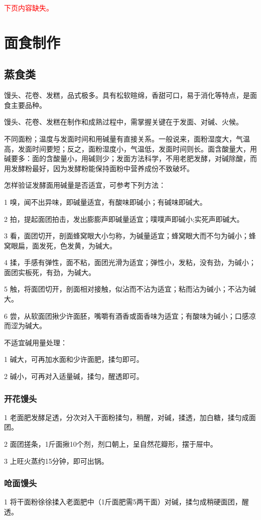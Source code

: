 \documentclass{ctexbook}
\begin{document}
\textcolor{red}{下页内容缺失。}
\chapter{面食制作}
\section{蒸食类}
馒头、花卷、发糕，品式极多。具有松软暄绵，香甜可口，易于消化等特点，是面食主要品种。

馒头、花卷、发糕在制作和成熟过程中，需掌握关键在于发面、对碱、火候。

不同面粉；温度与发面时间和用碱量有直接关系。一般说来，面粉湿度大，气温高，发面时间要短；反之，面粉湿度小，气温低，发面时间则长。面含酸量大，用碱要多：面的含酸量小，用碱则少；发面方法科学，不用老肥发酵，对碱除酸，而用发酵粉最好，因为发酵粉能保持面粉中营养成份不致破坏。

怎样验证发酵面用碱量是否适宜，可参考下列方法：

1 嗅，闻不出异味，即碱量适宜，有酸味即碱小；有碱味即碱大。

2 拍，提起面团拍击，发出膨膨声即碱量适宜；噗噗声即碱小;实死声即碱大。

3 看，面团切开，剖面蜂窝眼大小匀称，为碱量适宜；蜂窝眼大而不匀为碱小；蜂窝眼扁，面发死，色发黄，为碱大。

4 揉，手感有弹性，面不粘，面团光滑为适宜；弹性小，发粘，没有劲，为碱小；面团实板死，有劲，为碱大。

5 触，将面团切开，剖面相对接触，似沾而不沾为适宜；粘而沾为碱小；不沾为碱大。

6 尝，从软面团揪少许面胚，嘴嚼有酒香或面香味为适宜；有酸味为碱小；口感凉而涩为碱大。

不适宜碱用量处理：

1 碱大，可再加水面和少许面肥，揉匀即可。

2 碱小，可再对入适量碱，揉匀，醒透即可。
\subsection{开花馒头}
1 老面肥发酵足透，分次对入干面粉揉匀，稍醒，对碱，揉透，加白糖，揉匀成面团。

2 面团搓条，1斤面揪10个剂，剂口朝上，呈自然花瓣形，摆于屉中。

3 上旺火蒸约15分钟，即可出锅。
\subsection{呛面馒头}
1 将干面粉徐徐揉入老面肥中（1斤面肥需5两干面）对碱，揉匀成稍硬面团，醒透。
\end{document}
